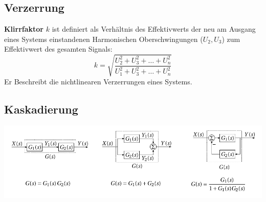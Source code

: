 \subsection{Verzerrung}
\textbf{Klirrfaktor} $k$ ist definiert als Verhältnis des Effektivwerts der neu am Ausgang eines Systems einstandenen Harmonischen Oberschwingungen ($U_2, U_3$) zum Effektivwert des gesamten Signals:
\[
k = \sqrt{\frac{U^2_2 + U^2_3 + \dots + U_n^2}{U^2_1 + U^2_3 + \dots + U_n^2}}
\]
Er Beschreibt die nichtlinearen Verzerrungen eines Systems.

\subsection{Kaskadierung}
\includegraphics[width=\columnwidth]{Images/systeme}
